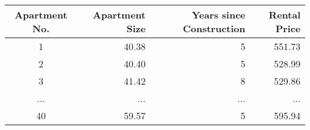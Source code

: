 \begin{tabular}{crrr}
\toprule
Apartment No. & Apartment Size & Years since Construction & Rental Price \\
\midrule
            1 &          40.38 &                        5 &       551.73 \\
            2 &          40.40 &                        5 &       528.99 \\
            3 &          41.42 &                        8 &       529.86 \\
          ... &            ... &                      ... &          ... \\
           40 &          59.57 &                        5 &       595.94 \\
\bottomrule
\end{tabular}
